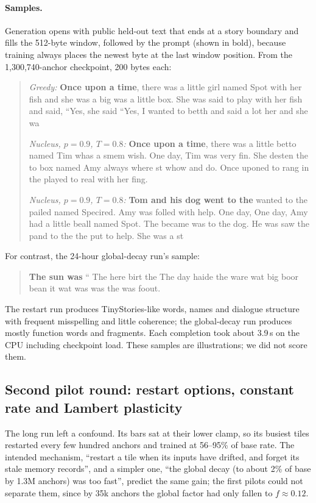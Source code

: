 \documentclass[10pt]{article}
\begin{document}
\paragraph{Samples.}
Generation opens with public held-out text that ends at a story boundary and fills the 512-byte window,
followed by the prompt (shown in bold), because training always places the newest byte at the last
window position. From the 1,300,740-anchor checkpoint, 200 bytes each:

\begin{quote}\small
\emph{Greedy:} \textbf{Once upon a time}, there was a little girl named Spot with her fish and she was a
big was a little box. She was said to play with her fish and said, ``Yes, she said
``Yes, I wanted to betth and said a lot her and she wa

\emph{Nucleus, $p=0.9$, $T=0.8$:} \textbf{Once upon a time}, there was a little betto named Tim whas a
smem wish. One day, Tim was very fin. She desten the to box named Amy always where st whow and do. Once
uponed to rang in the played to real with her fing.

\emph{Nucleus, $p=0.9$, $T=0.8$:} \textbf{Tom and his dog went to the} wanted to the pailed named
Specired. Amy was folled with help. One day, One day, Amy had a little beall named Spot. The became was
to the dog. He was saw the pand to the the put to help. She was a st
\end{quote}
For contrast, the 24-hour global-decay run's sample:
\begin{quote}\small
\textbf{The sun was} `` The here birt the The day haide the ware wat big boor bean it wat
was was the was foout.
\end{quote}
The restart run produces TinyStories-like words, names and dialogue structure with frequent misspelling
and little coherence; the global-decay run produces mostly function words and fragments. Each
completion took about 3.9\,s on the CPU including checkpoint load. These samples are illustrations; we
did not score them.

\subsection{Second pilot round: restart options, constant rate and Lambert plasticity}
\label{sec:pilot2}

The long run left a confound. Its bars sat at their lower clamp, so its busiest tiles restarted every
few hundred anchors and trained at 56--95\% of base rate. The intended mechanism, ``restart a tile when
its inputs have drifted, and forget its stale memory records'', and a simpler one, ``the global decay
(to about 2\% of base by 1.3M anchors) was too fast'', predict the same gain; the first pilots could
not separate them, since by 35k anchors the global factor had only fallen to $f\approx 0.12$.
\end{document}
